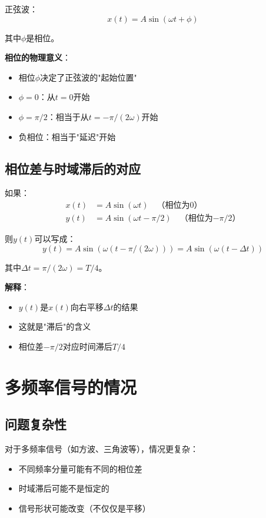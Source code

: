 \documentclass[12pt,a4paper]{article}
\begin{document}
正弦波：
\begin{equation}
x(t) = A\sin(\omega t + \phi)
\end{equation}

其中$\phi$是相位。

\textbf{相位的物理意义}：
\begin{itemize}
\item 相位$\phi$决定了正弦波的"起始位置"
\item $\phi = 0$：从$t = 0$开始
\item $\phi = \pi/2$：相当于从$t = -\pi/(2\omega)$开始
\item 负相位：相当于"延迟"开始
\end{itemize}

\subsection{相位差与时域滞后的对应}

如果：
\begin{align}
x(t) &= A\sin(\omega t) \quad \text{（相位为0）} \\
y(t) &= A\sin(\omega t - \pi/2) \quad \text{（相位为$-\pi/2$）}
\end{align}

则$y(t)$可以写成：
\begin{equation}
y(t) = A\sin(\omega(t - \pi/(2\omega))) = A\sin(\omega(t - \Delta t))
\end{equation}

其中$\Delta t = \pi/(2\omega) = T/4$。

\textbf{解释}：
\begin{itemize}
\item $y(t)$是$x(t)$向右平移$\Delta t$的结果
\item 这就是"滞后"的含义
\item 相位差$-\pi/2$对应时间滞后$T/4$
\end{itemize}

\section{多频率信号的情况}

\subsection{问题复杂性}

对于多频率信号（如方波、三角波等），情况更复杂：

\begin{itemize}
\item 不同频率分量可能有不同的相位差
\item 时域滞后可能不是恒定的
\item 信号形状可能改变（不仅仅是平移）
\end{itemize}
\end{document}
